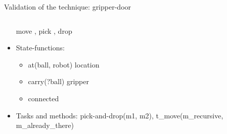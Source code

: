 \begin{frame}[c,fragile]{Validation of the technique: gripper-door}
\begin{columns}[T]
\begin{column}
\begin{itemize}
             move
            , pick
             , drop
            \item State-functions:
                \begin{itemize}
                    \item at({ball, robot}) location
                    \item carry(?ball) gripper
                    \item connected
                \end{itemize}
            \item Tasks and methods: pick-and-drop(m1, m2), t\_move(m\_recursive, m\_already\_there)   
        \end{itemize}
    \end{column}
    
\end{columns} 
\end{frame}

